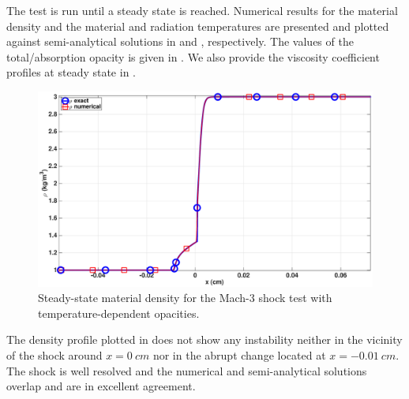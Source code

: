 \documentclass[times,doublespace]{fldauth}%
\begin{document}
The test is run until a steady state is reached. Numerical results for the material density and the material and radiation temperatures are presented and plotted against semi-analytical solutions in  and , respectively. The values of the total/absorption opacity is given in . We also provide the viscosity coefficient profiles at steady state in .
%
\begin{figure}[H]
    \centering
    \includegraphics[width=\textwidth]{figures/dpt-xs/mach_3_nel_1000_density.eps}
    \caption{Steady-state material density for the Mach-3 shock test with temperature-dependent opacities.}\label{fig:mach-3-dpt-xs-dens}
\end{figure}
%
The density profile plotted in  does not show any instability neither in the vicinity of the shock around $x = 0 \ cm$ nor in the abrupt change located at $x = -0.01 \ cm$. The shock is well resolved and the numerical and semi-analytical solutions overlap and are in excellent agreement.
%
\end{document}
